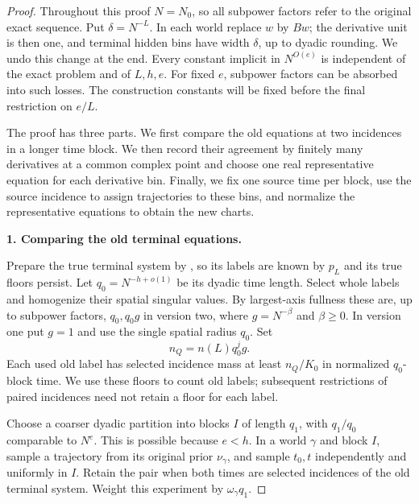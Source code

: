 \begin{proof}
Throughout this proof \(N=N_0\), so all subpower factors refer to
the original exact sequence. Put \(\delta=N^{-L}\). In each world
replace \(w\) by \(Bw\); the derivative unit is then one, and
terminal hidden bins have width \(\delta\), up to dyadic rounding.
We undo this change at the end. Every constant implicit in
\(N^{O(e)}\) is independent of the exact problem and of \(L,h,e\).
For fixed \(e\), subpower factors can be absorbed into such losses.
The construction constants will be fixed before the final restriction
on \(e/L\).

The proof has three parts. We first compare the old equations at
two incidences in a longer time block. We then record their agreement
by finitely many derivatives at a common complex point and choose
one real representative equation for each derivative bin. Finally,
we fix one source time per block, use the source incidence to assign
trajectories to these bins, and normalize the representative equations
to obtain the new charts.

\par\smallskip\noindent\textbf{1. Comparing the old terminal equations.}

Prepare the true terminal system by , so its
labels are known by \(p_L\) and its true floors persist. Let
\(q_0=N^{-h+o(1)}\) be its dyadic time length. Select whole labels
and homogenize their spatial singular values. By largest-axis
fullness these are, up to subpower factors, \(q_0,q_0g\) in
version two, where \(g=N^{-\beta}\) and \(\beta\ge0\). In version
one put \(g=1\) and use the single spatial radius \(q_0\). Set
\begin{equation}
 n_Q=n(L)q_0^j g.
 \label{a02:terminal-floor-scale}
\end{equation}
Each used old label has selected incidence mass at least
\(n_Q/K_0\) in normalized \(q_0\)-block time. We use these
floors to count old labels; subsequent restrictions of paired
incidences need not retain a floor for each label.

Choose a coarser dyadic partition into blocks \(I\) of length
\(q_1\), with \(q_1/q_0\) comparable to \(N^e\). This is possible
because \(e<h\). In a world \(\gamma\) and block \(I\), sample
a trajectory from its original prior \(\nu_\gamma\), and sample
\(t_0,t\) independently and uniformly in \(I\). Retain the pair
when both times are selected incidences of the old terminal system.
Weight this experiment by \(\omega_\gamma q_1\).


\end{proof}
